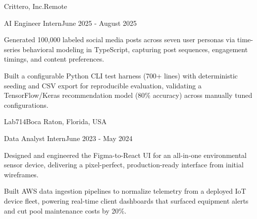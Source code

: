 \documentclass[10pt, letterpaper]{article}
\begin{document}
\vspace{\entrySpacing}
\begin{leadershipentry}{Crittero, Inc.}{Remote}
	\begin{positionentry}{AI Engineer Intern}{June 2025 - August 2025}
		\item Generated 100,000 labeled social media posts across seven user personas via time-series behavioral modeling in TypeScript, capturing post sequences, engagement timings, and content preferences.
		\item Built a configurable Python CLI test harness (700+ lines) with deterministic seeding and CSV export for reproducible evaluation, validating a TensorFlow/Keras recommendation model (80\% accuracy) across manually tuned configurations.
	\end{positionentry}
\end{leadershipentry}

\vspace{\entrySpacing}
\begin{leadershipentry}{Lab714}{Boca Raton, Florida, USA}
	\begin{positionentry}{Data Analyst Intern}{June 2023 - May 2024}
		\item Designed and engineered the Figma-to-React UI for an all-in-one environmental sensor device, delivering a pixel-perfect, production-ready interface from initial wireframes.
		\item Built AWS data ingestion pipelines to normalize telemetry from a deployed IoT device fleet, powering real-time client dashboards that surfaced equipment alerts and cut pool maintenance costs by 20\%.
	\end{positionentry}
\end{leadershipentry}

\vspace{\headerSpacing}


\section{}
\end{document}
